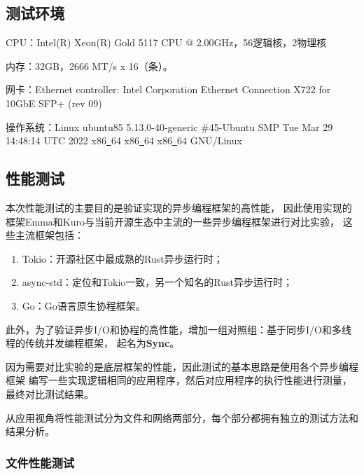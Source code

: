 \documentclass[supercite]{HustGraduPaper}
\theoremstyle{definition}
\begin{document}
\subsection{测试环境}
CPU：Intel(R) Xeon(R) Gold 5117 CPU @ 2.00GHz，56逻辑核，2物理核\par

内存：32GB，2666 MT/s x 16（条）。\par

网卡：Ethernet controller: Intel Corporation Ethernet Connection X722 for 10GbE SFP+ (rev 09)\par

操作系统：Linux ubuntu85 5.13.0-40-generic \#45-Ubuntu SMP Tue Mar 29 14:48:14 UTC 2022 x86\underline{~}64 x86\underline{~}64 x86\underline{~}64 GNU/Linux\par

\subsection{性能测试}

本次性能测试的主要目的是验证实现的异步编程框架的高性能，
因此使用实现的框架Emma和Kuro与当前开源生态中主流的一些异步编程框架进行对比实验，
这些主流框架包括：

\begin{enumerate}[label={(\arabic*)}]
  \item Tokio：开源社区中最成熟的Rust异步运行时；
  \item async-std：定位和Tokio一致，另一个知名的Rust异步运行时；
  \item Go：Go语言原生协程框架。
\end{enumerate}

此外，为了验证异步I/O和协程的高性能，增加一组对照组：基于同步I/O和多线程的传统并发编程框架，
起名为\textbf{Sync}。\par

因为需要对比实验的是底层框架的性能，因此测试的基本思路是使用各个异步编程框架
编写一些实现逻辑相同的应用程序，然后对应用程序的执行性能进行测量，最终对比测试结果。\par

从应用视角将性能测试分为文件和网络两部分，每个部分都拥有独立的测试方法和结果分析。\par

\subsubsection{文件性能测试}

\end{document}
